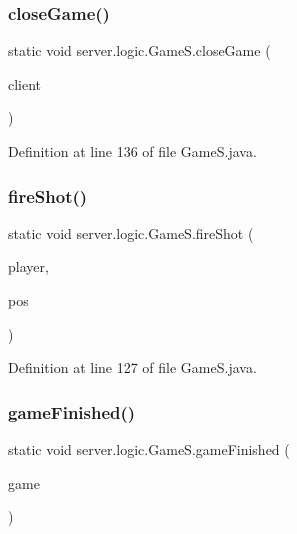 \subsubsection{\texorpdfstring{close\+Game()}{closeGame()}}
{\footnotesize\ttfamily static void server.\+logic.\+Game\+S.\+close\+Game (\begin{DoxyParamCaption}\item[{\hyperlink{classserver_1_1conn_1_1_client}{Client}}]{client }\end{DoxyParamCaption})\hspace{0.3cm}{\ttfamily [static]}}



Definition at line 136 of file Game\+S.\+java.

\hypertarget{classserver_1_1logic_1_1_game_s_aeac56542c71aaa0f3a9571bce4ba962f}{}\label{classserver_1_1logic_1_1_game_s_aeac56542c71aaa0f3a9571bce4ba962f} 
\subsubsection{\texorpdfstring{fire\+Shot()}{fireShot()}}
{\footnotesize\ttfamily static void server.\+logic.\+Game\+S.\+fire\+Shot (\begin{DoxyParamCaption}\item[{\hyperlink{classserver_1_1conn_1_1_client}{Client}}]{player,  }\item[{\hyperlink{classsharedlib_1_1utils_1_1_coord}{Coord}}]{pos }\end{DoxyParamCaption})\hspace{0.3cm}{\ttfamily [static]}}



Definition at line 127 of file Game\+S.\+java.

\hypertarget{classserver_1_1logic_1_1_game_s_a51295bb07c4b243cf798e34eb84eb4ec}{}\label{classserver_1_1logic_1_1_game_s_a51295bb07c4b243cf798e34eb84eb4ec} 
\subsubsection{\texorpdfstring{game\+Finished()}{gameFinished()}}
{\footnotesize\ttfamily static void server.\+logic.\+Game\+S.\+game\+Finished (\begin{DoxyParamCaption}\item[{\hyperlink{classserver_1_1logic_1_1game_1_1_game_play}{Game\+Play}}]{game }\end{DoxyParamCaption})\hspace{0.3cm}{\ttfamily [static]}}



